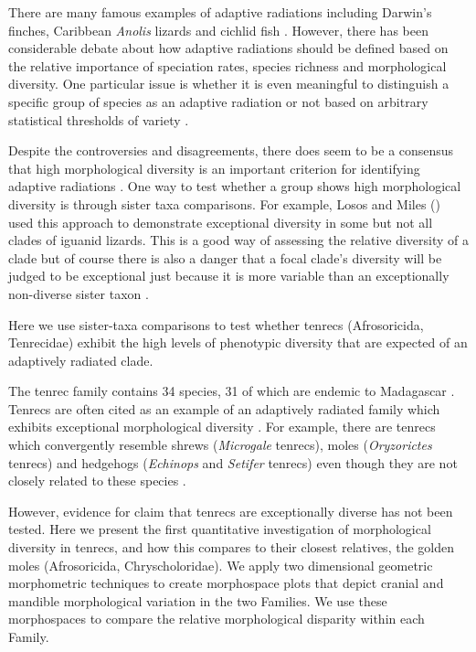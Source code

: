 \documentclass[12pt,a4paper]{article}
\begin{document}
	There are many famous examples of adaptive radiations including Darwin's finches, Caribbean \textit{Anolis} lizards and cichlid fish \citep{Gavrilets2009}. However, there has been considerable debate about how adaptive radiations should be defined \citep{Glor2010, Losos2010a} based on the relative importance of speciation rates, species richness and morphological diversity. One particular issue is whether it is even meaningful to distinguish a specific group of species as an adaptive radiation or not based on arbitrary statistical thresholds of variety \citep{Olson2009}.

	Despite the controversies and disagreements, there does seem to be a consensus that high morphological diversity is an important criterion for identifying adaptive radiations \citep{Losos2010a, Olson2009}. One way to test whether a group shows high morphological diversity is through sister taxa comparisons. For example, Losos and Miles (\citeyear{Losos2002}) used this approach to demonstrate exceptional diversity in some but not all clades of iguanid lizards. This is a good way of assessing the relative diversity of a clade but of course there is also a danger that a focal clade's diversity will be judged to be exceptional just because it is more variable than an exceptionally non-diverse sister taxon \citep{Losos2002}. 


	Here we use sister-taxa comparisons to test whether tenrecs (Afrosoricida, Tenrecidae) exhibit the high levels of phenotypic diversity that are expected of an adaptively radiated clade.


	The tenrec family contains 34 species, 31 of which are endemic to Madagascar \citep{Olson2013}. Tenrecs are often cited as an example of an adaptively radiated family which exhibits exceptional morphological diversity \citep{Soarimalala2011, Olson2003}. For example, there are tenrecs which convergently resemble shrews (\textit{Microgale} tenrecs), moles (\textit{Oryzorictes} tenrecs) and hedgehogs (\textit{Echinops} and \textit{Setifer} tenrecs) \citep{Eisenberg1969} even though they are not closely related to these species \citep{Stanhope1998}.

	However, evidence for claim that tenrecs are exceptionally diverse has not been tested. Here we present the first quantitative investigation of morphological diversity in tenrecs, and how this compares to their closest relatives, the golden moles (Afrosoricida, Chryscholoridae). 
	We apply two dimensional geometric morphometric techniques \citep{Rohlf1993, Adams2013} to create morphospace plots that depict cranial and mandible morphological variation in the two Families. We use these morphospaces to compare the relative morphological disparity \citep{Foote1997, Wills1994, Erwin2007} within each Family. 
	
\end{document}
